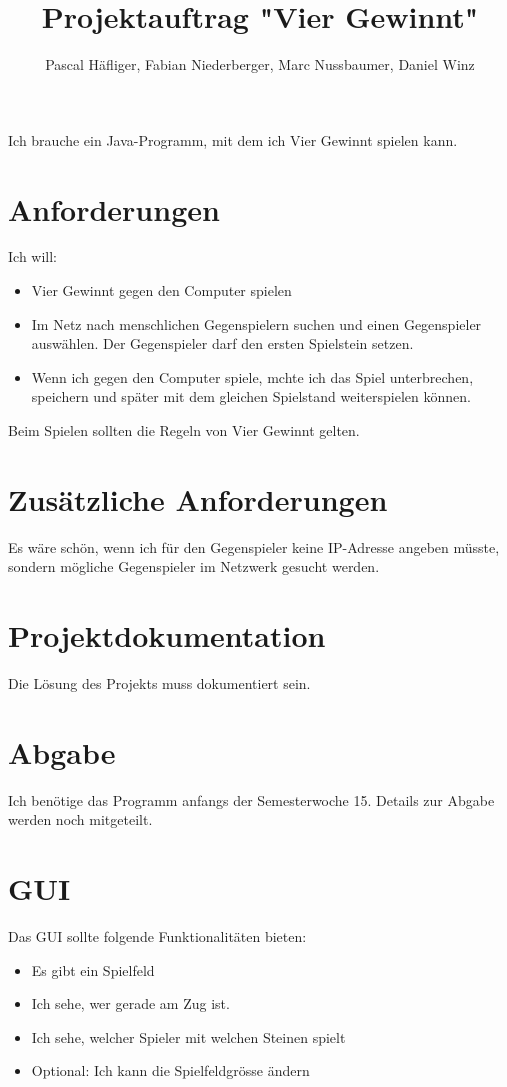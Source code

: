 \documentclass[a4paper, 10pt, fleqn]{article}
\author{Pascal Häfliger, Fabian Niederberger, Marc Nussbaumer, Daniel Winz}
\title{Projektauftrag "Vier Gewinnt"}
\begin{document}
\maketitle
Ich brauche ein Java-Programm, mit dem ich Vier Gewinnt spielen kann. 

\section*{Anforderungen}
Ich will: 
\begin{itemize}
    \item Vier Gewinnt gegen den Computer spielen
    \item Im Netz nach menschlichen Gegenspielern suchen und einen 
        Gegenspieler auswählen. Der Gegenspieler darf den ersten 
        Spielstein setzen. 
    \item Wenn ich gegen den Computer spiele, mchte ich das Spiel 
        unterbrechen, speichern und später mit dem gleichen Spielstand 
        weiterspielen können. 
\end{itemize}
Beim Spielen sollten die Regeln von Vier Gewinnt gelten. 

\section*{Zusätzliche Anforderungen}
Es wäre schön, wenn ich für den Gegenspieler keine IP-Adresse angeben 
müsste, sondern mögliche Gegenspieler im Netzwerk gesucht werden. 

\section*{Projektdokumentation}
Die Lösung des Projekts muss dokumentiert sein. 

\section*{Abgabe}
Ich benötige das Programm anfangs der Semesterwoche 15. Details zur Abgabe 
werden noch mitgeteilt. 

\section*{GUI}
Das GUI sollte folgende Funktionalitäten bieten: 
\begin{itemize}
    \item Es gibt ein Spielfeld
    \item Ich sehe, wer gerade am Zug ist. 
    \item Ich sehe, welcher Spieler mit welchen Steinen spielt
    \item Optional: Ich kann die Spielfeldgrösse ändern
\end{itemize}
\end{document}

